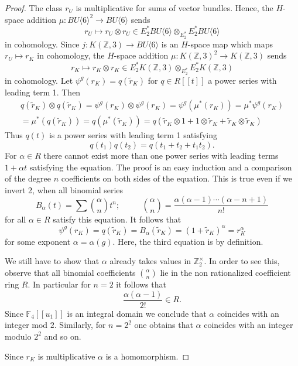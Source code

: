 \documentclass{amsart}
\newcommand {\F}{{\mathbb F}}
\newcommand {\Z}{{\mathbb Z}}
\numberwithin{equation}{section}
\theoremstyle{definition}  %
\newtheorem{set theory}[thm]{Set Theoretic Prelude}
\begin{document}
\begin{proof}
The class $r_U$ is multiplicative for sums of vector bundles. Hence,
the $H$-space addition $\mu: BU\langle 6\rangle^2 \to BU\langle 6\rangle$ sends 
$$r_U\mapsto r_U\otimes r_U\in E_2^*BU\langle 6\rangle\otimes_{E_2^*}E_2^*BU\langle 6\rangle$$
in cohomology. 
Since $j:K(\Z,3)\to BU\langle 6\rangle$ is an $H$-space map which maps $r_U\mapsto r_K$ in cohomology, 
the $H$-space addition $\mu: K(\Z,3)^2\to K(\Z,3)$ sends 
$$r_K\mapsto r_K\otimes r_K\in E_2^*K(\Z,3)\otimes_{E_2^*}E_2^*K(\Z,3)$$ 
in cohomology.
Let $\psi^g(r_K)=q(\tilde{r}_K)$ for $q\in R[\! [t]\! ]$ a power series with leading term 1.
Then 
\begin{align*}
q(\tilde{r}_K)\otimes q(\tilde{r}_K) =\psi^g(r_K)\otimes\psi^g(r_K)=\psi^g(\mu^*(r_K))=\mu^*\psi^g(r_K)\\
=\mu^*(q(\tilde{r}_K))=q(\mu^*(\tilde{r}_K))=q(\tilde{r}_K\otimes 1 + 1\otimes \tilde{r}_K + \tilde{r}_K\otimes\tilde{r}_K)
\end{align*}
Thus $q(t)$ is a power series with leading term 1 satisfying 
\begin{equation} \label{powere}
q(t_1)q(t_2)=q(t_1+t_2+t_1t_2).
\end{equation}
For $\alpha\in R$ there cannot exist more than one power series with leading terms $1+\alpha t $ satisfying the equation. The proof is an easy 
induction and a comparison of  the degree $n$ coefficients on both sides of the equation.
This is true even if we invert 2, when all binomial series 
$$B_\alpha(t)=\sum{\alpha\choose n}t^n; \qquad \mbox{ } \binom{\alpha}{n}= \frac{\alpha (\alpha -1)\cdots (\alpha-n+1)}{n!}$$ for all $\alpha\in R$ satisfy this equation. 
It follows that 
$$\psi^g(r_K)=q(\tilde{r}_K)=B_\alpha(\tilde{r}_K)= (1+\tilde{r}_K)^\alpha= r_K^{\alpha}$$ for some exponent $\alpha=\alpha(g)$. Here, the third equation is by definition. \par
We still have to show that $\alpha$ already takes values in  $\Z_2^\times$. 
In order to see this, observe that all binomial coefficients $\binom{\alpha}{n}$ lie in the non rationalized coefficient ring $R$.
In particular  for $n=2$ it follows that  
$$\frac{\alpha (\alpha -1)}{2!}\in R.$$
Since $ \F_4[\! [u_1]\!]$ is an integral domain we conclude that 
$ \alpha$ coincides with an integer mod $2$. Similarly, for $n=2^2$ one obtains that $\alpha$ coincides with an integer modulo $2^2$ and so on. 
\par Since $r_K$ is multiplicative  $\alpha$ is  a homomorphism.
\end{proof}
\end{document}
